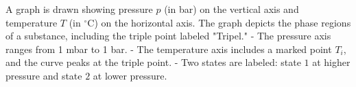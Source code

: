 A graph is drawn showing pressure \( p \) (in bar) on the vertical axis and temperature \( T \) (in \( ^\circ \text{C} \)) on the horizontal axis. The graph depicts the phase regions of a substance, including the triple point labeled "Tripel."  
- The pressure axis ranges from 1 mbar to 1 bar.  
- The temperature axis includes a marked point \( T_i \), and the curve peaks at the triple point.  
- Two states are labeled: state \( 1 \) at higher pressure and state \( 2 \) at lower pressure.
